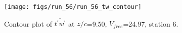 \begin{figure}[H]
\centering
\texttt{[image: figs/run\_56/run\_56\_tw\_contour]}
\caption{Contour plot of $\overline{t^\prime w^\prime}$ at $z/c$=9.50, $V_{free}$=24.97, station 6.}
\label{fig:run_56_tw_contour}
\end{figure}


